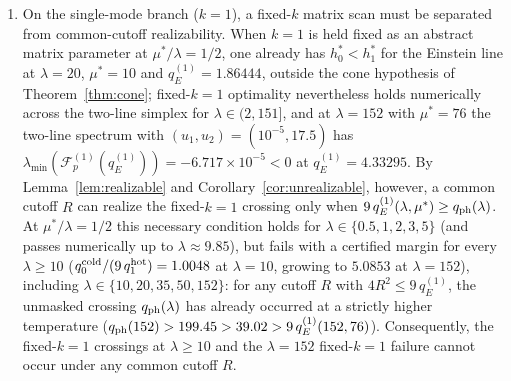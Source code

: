 \documentclass[11pt]{article}
\newcommand{\Fcal}{\mathcal F}
\newcommand{\muS}{\mu^{*}}
\theoremstyle{definition}
\theoremstyle{remark}
\begin{document}
\begin{enumerate}[label=(\arabic*),leftmargin=2.2em]
\item On the single-mode branch ($k=1$), a fixed-$k$ matrix scan must be separated from common-cutoff realizability. When $k=1$ is held fixed as an abstract matrix parameter at $\muS/\lambda=1/2$, one already has $h^*_0<h^*_1$ for the Einstein line at $\lambda=20$, $\muS=10$ and $q_E^{(1)}=1.86444$, outside the cone hypothesis of Theorem~\ref{thm:cone}; fixed-$k=1$ optimality nevertheless holds numerically across the two-line simplex for $\lambda\in(2,151]$, and at $\lambda=152$ with $\muS=76$ the two-line spectrum with $(u_1,u_2)=(10^{-5},17.5)$ has $\lambda_{\min}(\Fcal_p^{(1)}(q_E^{(1)}))=-6.717\times10^{-5}<0$ at $q_E^{(1)}=4.33295$. By Lemma~\ref{lem:realizable} and Corollary~\ref{cor:unrealizable}, however, a common cutoff $R$ can realize the fixed-$k=1$ crossing only when $9\,q_E^{(1)}(\lambda,\muS)\ge q_{\rm ph}(\lambda)$. At $\muS/\lambda=1/2$ this necessary condition holds for $\lambda\in\{0.5,1,2,3,5\}$ (and passes numerically up to $\lambda\approx9.85$), but fails with a certified margin for every $\lambda\ge10$ ($q_0^{\rm cold}/(9\,q_1^{\rm hot})=1.0048$ at $\lambda=10$, growing to $5.0853$ at $\lambda=152$), including $\lambda\in\{10,20,35,50,152\}$: for any cutoff $R$ with $4R^2\le9\,q_E^{(1)}$, the unmasked crossing $q_{\rm ph}(\lambda)$ has already occurred at a strictly higher temperature ($q_{\rm ph}(152)>199.45>39.02>9\,q_E^{(1)}(152,76)$). Consequently, the fixed-$k=1$ crossings at $\lambda\ge10$ and the $\lambda=152$ fixed-$k=1$ failure cannot occur under any common cutoff $R$.
\end{enumerate}
\end{document}
